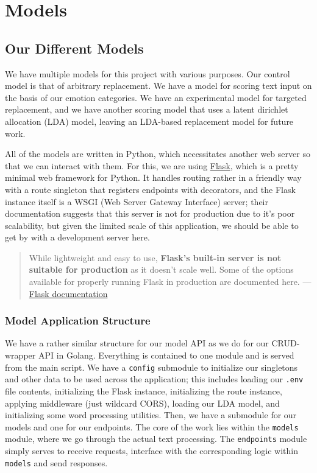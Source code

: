 \documentclass[11pt, twoside, reqno]{book}
\begin{document}
\startmain
\chapter{Models}

\section{Our Different Models}

We have multiple models for this project with various purposes. Our control model is that of arbitrary replacement. We have a model for scoring text input on the basis of our emotion categories. We have an experimental model for targeted replacement, and we have another scoring model that uses a latent dirichlet allocation (LDA) model, leaving an LDA-based replacement model for future work.

All of the models are written in Python, which necessitates another web server so that we can interact with them. For this, we are using \href{https://flask.palletsprojects.com/en/1.1.x/}{Flask}, which is a pretty minimal web framework for Python. It handles routing rather in a friendly way with a route singleton that registers endpoints with decorators, and the Flask instance itself is a WSGI (Web Server Gateway Interface) server; their documentation suggests that this server is not for production due to it's poor scalability, but given the limited scale of this application, we should be able to get by with a development server here.

\begin{quote}
While lightweight and easy to use, \textbf{Flask’s built-in server is not suitable for production} as it doesn’t scale well. Some of the options available for properly running Flask in production are documented here. — \href{https://flask.palletsprojects.com/en/1.1.x/}{Flask documentation}
\end{quote}

\subsection{Model Application Structure}

We have a rather similar structure for our model API as we do for our CRUD-wrapper API in Golang. Everything is contained to one module and is served from the main script. We have a \texttt{config} submodule to initialize our singletons and other data to be used across the application; this includes loading our \texttt{.env} file contents, initializing the Flask instance, initializing the route instance, applying middleware (just wildcard CORS), loading our LDA model, and initializing some word processing utilities. Then, we have a submodule for our models and one for our endpoints. The core of the work lies within the \texttt{models} module, where we go through the actual text processing. The \texttt{endpoints} module simply serves to receive requests, interface with the corresponding logic within \texttt{models} and send responses.
\end{document}
